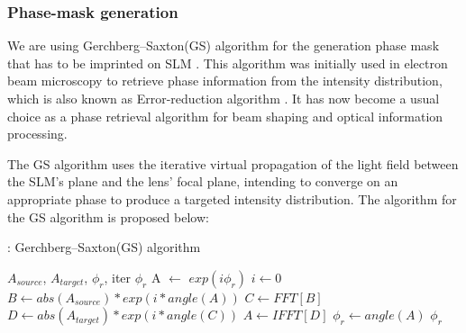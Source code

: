 \subsubsection{Phase-mask generation}
We are using Gerchberg–Saxton(GS) algorithm for the generation phase mask that has to be imprinted on SLM \cite{gerchberg1972practical}. This algorithm was initially used in electron beam microscopy to retrieve phase information from the intensity distribution, which is also known as Error-reduction algorithm \cite{khare2015fourier}. It has now become a usual choice as a phase retrieval algorithm for beam shaping and optical information processing.

The GS algorithm uses the iterative virtual propagation of the light field between the SLM's plane and the lens' focal plane, intending to converge on an appropriate phase to produce a targeted intensity distribution. The algorithm for the GS algorithm is proposed below:

\begin{breakablealgorithm}
\caption{: Gerchberg–Saxton(GS) algorithm}\label{alg:GS}
\algrenewcommand{}
\algrenewcommand{}
    \begin{algorithmic}
        \Require  $A_{source}$,  $A_{target}$, $\phi_{r}$, iter
        \Ensure $\phi_{r}$ 
        \State A $\leftarrow$ $exp(i\phi_r)$
        \State $i\leftarrow 0$
            \State $B \leftarrow abs(A_{source})*exp(i*angle(A))$
            \State $C \leftarrow FFT[B]$
            \State $D \leftarrow abs(A_{target})*exp(i*angle(C))$
            \State $A \leftarrow IFFT[D]$
        \EndWhile
        \State $\phi_r \leftarrow angle(A)$
        \State \Return $\phi_r$
\end{algorithmic}
\end{breakablealgorithm}

